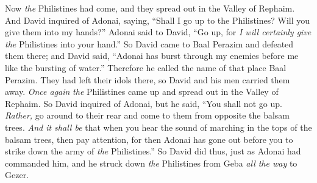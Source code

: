 \begin{biblechapter}
\verse Now \textit{the} Philistines had come, and they spread out in the Valley of Rephaim.
\verse And David inquired of Adonai, saying, “Shall I go up to the Philistines? Will you give them into my hands?” Adonai said to David, “Go up, for \textit{I will certainly give} \textit{the} Philistines into your hand.”
\verse So David came to Baal Perazim and defeated them there; and David said, “Adonai has burst through my enemies before me like the bursting of water.” Therefore he called the name of that place Baal Perazim.
\verse They had left their idols there, so David and his men carried them away.
\verse \textit{Once again} \textit{the} Philistines came up and spread out in the Valley of Rephaim.
\verse So David inquired of Adonai, but he said, “You shall not go up. \textit{Rather,} go around to their rear and come to them from opposite the balsam trees.
\verse \textit{And it shall be} that when you hear the sound of marching in the tops of the balsam trees, then pay attention, for then Adonai has gone out before you to strike down the army of \textit{the} Philistines.”
\verse So David did thus, just as Adonai had commanded him, and he struck down \textit{the} Philistines from Geba \textit{all the way} to Gezer.
\end{biblechapter}

